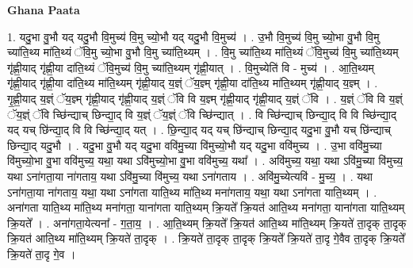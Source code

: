 \documentclass[17pt]{extarticle}
\begin{document}
\textbf{Ghana Paata } \newline

1. यदु॒भा वु॒भौ यद् यदु॒भौ वि॒मुच्य॑ वि॒मु च्यो॒भौ यद् यदु॒भौ वि॒मुच्य॑ । . उ॒भौ वि॒मुच्य॑ वि॒मु च्यो॒भा वु॒भौ वि॒मु च्या॑ति॒थ्य मा॑ति॒थ्यं ॅवि॒मु च्यो॒भा वु॒भौ वि॒मु च्या॑ति॒थ्यम् । . वि॒मु च्या॑ति॒थ्य मा॑ति॒थ्यं ॅवि॒मुच्य॑ वि॒मु च्या॑ति॒थ्यम् गृ॑ह्णी॒याद् गृ॑ह्णी॒या दा॑ति॒थ्यं ॅवि॒मुच्य॑ वि॒मु च्या॑ति॒थ्यम् गृ॑ह्णी॒यात् । . वि॒मुच्येति॑ वि - मुच्य॑ । . आ॒ति॒थ्यम् गृ॑ह्णी॒याद् गृ॑ह्णी॒या दा॑ति॒थ्य मा॑ति॒थ्यम् गृ॑ह्णी॒याद् य॒ज्ञ्ं ॅय॒ज्ञ्म् गृ॑ह्णी॒या दा॑ति॒थ्य मा॑ति॒थ्यम् गृ॑ह्णी॒याद् य॒ज्ञ्म् । . गृ॒ह्णी॒याद् य॒ज्ञ्ं ॅय॒ज्ञ्म् गृ॑ह्णी॒याद् गृ॑ह्णी॒याद् य॒ज्ञ्ं ॅवि वि य॒ज्ञ्म् गृ॑ह्णी॒याद् गृ॑ह्णी॒याद् य॒ज्ञ्ं ॅवि । . य॒ज्ञ्ं ॅवि वि य॒ज्ञ्ं ॅय॒ज्ञ्ं ॅवि च्छि॑न्द्याच् छिन्द्या॒द् वि य॒ज्ञ्ं ॅय॒ज्ञ्ं ॅवि च्छि॑न्द्यात् । . वि च्छि॑न्द्याच् छिन्द्या॒द् वि वि च्छि॑न्द्या॒द् यद् यच् छि॑न्द्या॒द् वि वि च्छि॑न्द्या॒द् यत् । . छि॒न्द्या॒द् यद् यच् छि॑न्द्याच् छिन्द्या॒द् यदु॒भा वु॒भौ यच् छि॑न्द्याच् छिन्द्या॒द् यदु॒भौ । . यदु॒भा वु॒भौ यद् यदु॒भा ववि॑मु॒च्या वि॑मुच्यो॒भौ यद् यदु॒भा ववि॑मुच्य । . उ॒भा ववि॑मु॒च्या वि॑मुच्यो॒भा वु॒भा ववि॑मुच्य॒ यथा॒ यथा ऽवि॑मुच्यो॒भा वु॒भा ववि॑मुच्य॒ यथा᳚ । . अवि॑मुच्य॒ यथा॒ यथा ऽवि॑मु॒च्या वि॑मुच्य॒ यथा ऽना॑गता॒या ना॑गताय॒ यथा ऽवि॑मु॒च्या वि॑मुच्य॒ यथा ऽना॑गताय । . अवि॑मु॒च्येत्यवि॑ - मु॒च्य॒ । . यथा ऽना॑गता॒या ना॑गताय॒ यथा॒ यथा ऽना॑गता याति॒थ्य मा॑ति॒थ्य मना॑गताय॒ यथा॒ यथा ऽना॑गता याति॒थ्यम् । . अना॑गता याति॒थ्य मा॑ति॒थ्य मना॑गता॒ याना॑गता याति॒थ्यम् क्रि॒यते᳚ क्रि॒यत॑ आति॒थ्य मना॑गता॒ याना॑गता याति॒थ्यम् क्रि॒यते᳚ । . अना॑गता॒येत्यना᳚ - ग॒ता॒य॒ । . आ॒ति॒थ्यम् क्रि॒यते᳚ क्रि॒यत॑ आति॒थ्य मा॑ति॒थ्यम् क्रि॒यते॑ ता॒दृक् ता॒दृक् क्रि॒यत॑ आति॒थ्य मा॑ति॒थ्यम् क्रि॒यते॑ ता॒दृक् । . क्रि॒यते॑ ता॒दृक् ता॒दृक् क्रि॒यते᳚ क्रि॒यते॑ ता॒दृ गे॒वैव ता॒दृक् क्रि॒यते᳚ क्रि॒यते॑ ता॒दृ गे॒व । \newline
\end{document}
